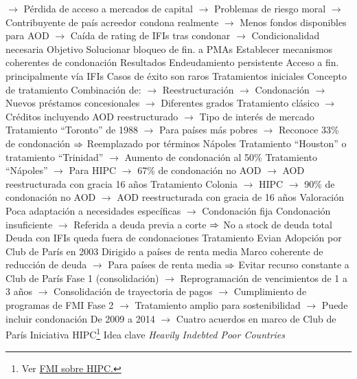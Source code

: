 \documentclass{nuevotema}
\begin{document}
\begin{esquemal}
				\4[] $\to$ Pérdida de acceso a mercados de capital
				\4[] $\to$ Problemas de riesgo moral
				\4[] $\to$ Contribuyente de país acreedor condona realmente
				\4[] $\to$ Menos fondos disponibles para AOD
				\4[] $\to$ Caída de rating de IFIs tras condonar
				\4[] $\to$ Condicionalidad necesaria
				\4 Objetivo
				\4[] Solucionar bloqueo de fin. a PMAs
				\4[] Establecer mecanismos coherentes de condonación
				\4 Resultados
				\4[] Endeudamiento persistente
				\4[] Acceso a fin. principalmente vía IFIs
				\4[] Casos de éxito son raros
			\3 Tratamientos iniciales
				\4 Concepto de tratamiento
				\4[] Combinación de:
				\4[] $\to$ Reestructuración
				\4[] $\to$ Condonación
				\4[] $\to$ Nuevos préstamos concesionales
				\4[] $\to$ Diferentes grados
				\4 Tratamiento clásico
				\4[] $\to$ Créditos incluyendo AOD reestructurado
				\4[] $\to$ Tipo de interés de mercado
				\4 Tratamiento ``Toronto'' de 1988
				\4[] $\to$ Para países más pobres
				\4[] $\to$ Reconoce 33\% de condonación
				\4[] $\Rightarrow$ Reemplazado por términos Nápoles
				\4 Tratamiento ``Houston'' o tratamiento ``Trinidad''
				\4[] $\to$ Aumento de condonación al 50\%
				\4 Tratamiento ``Nápoles''
				\4[] $\to$ Para HIPC
				\4[] $\to$ 67\% de condonación no AOD
				\4[] $\to$ AOD reestructurada con gracia 16 años
				\4 Tratamiento Colonia
				\4[] $\to$ HIPC
				\4[] $\to$ 90\% de condonación no AOD
				\4[] $\to$ AOD reestructurada con gracia de 16 años
				\4 Valoración
				\4[] Poca adaptación a necesidades específicas
				\4[] $\to$ Condonación fija
				\4[] Condonación insuficiente
				\4[] $\to$ Referida a deuda previa a corte
				\4[] $\Rightarrow$ No a stock de deuda total
				\4[] Deuda con IFIs queda fuera de condonaciones
			\3 Tratamiento Evian
				\4 Adopción por Club de París en 2003
				\4[] Dirigido a países de renta media
				\4 Marco coherente de reducción de deuda
				\4[] $\to$ Para países de renta media
				\4[] $\Rightarrow$ Evitar recurso constante a Club de París
				\4 Fase 1 (consolidación)
				\4[] $\to$ Reprogramación de vencimientos de 1 a 3 años
				\4[] $\to$ Consolidación de trayectoria de pagos
				\4[] $\to$ Cumplimiento de programas de FMI
				\4 Fase 2
				\4[] $\to$ Tratamiento amplio para sostenibilidad
				\4[] $\to$ Puede incluir condonación
				\4[] De 2009 a 2014
				\4[] $\to$ Cuatro acuerdos en marco de Club de París
			\3 Iniciativa HIPC\footnote{Ver \href{https://www.imf.org/en/About/Factsheets/Sheets/2016/08/01/16/11/Debt-Relief-Under-the-Heavily-Indebted-Poor-Countries-Initiative}{FMI sobre HIPC.}}
				\4 Idea clave
				\4[] \textit{Heavily Indebted Poor Countries}

\end{esquemal}
\end{document}
